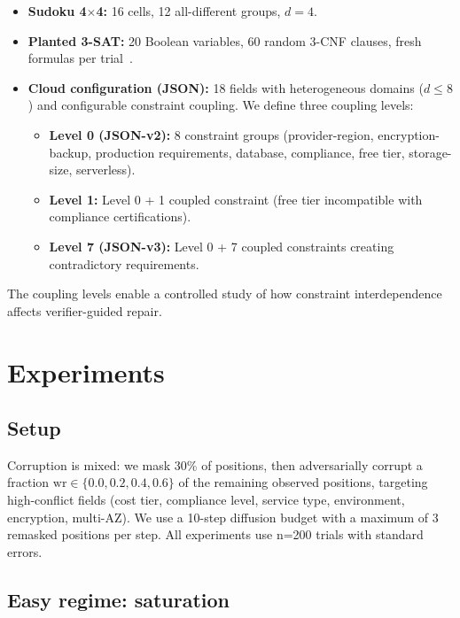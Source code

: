\documentclass[11pt,a4paper,twoside]{article}
\theoremstyle{definition}
\newcommand{\wrtext}{\text{wr}}
\begin{document}
\begin{itemize}[leftmargin=2em]
    \item \textbf{Sudoku 4$\times$4:} 16 cells, 12 all-different groups, $d=4$.
    \item \textbf{Planted 3-SAT:} 20 Boolean variables, 60 random 3-CNF clauses, fresh formulas per trial~\cite{boolsat}.
    \item \textbf{Cloud configuration (JSON):} 18 fields with heterogeneous domains ($d \le 8$) and configurable constraint coupling. We define three coupling levels:
        \begin{itemize}[leftmargin=2em]
            \item \textbf{Level 0 (JSON-v2):} 8 constraint groups (provider-region, encryption-backup, production requirements, database, compliance, free tier, storage-size, serverless).
            \item \textbf{Level 1:} Level 0 + 1 coupled constraint (free tier incompatible with compliance certifications).
            \item \textbf{Level 7 (JSON-v3):} Level 0 + 7 coupled constraints creating contradictory requirements.
        \end{itemize}
\end{itemize}

The coupling levels enable a controlled study of how constraint interdependence affects verifier-guided repair.

\section{Experiments}
\label{sec:experiments}

\subsection{Setup}
\label{sec:setup}

Corruption is mixed: we mask 30\% of positions, then adversarially corrupt a fraction $\wrtext \in \{0.0, 0.2, 0.4, 0.6\}$ of the remaining observed positions, targeting high-conflict fields (cost tier, compliance level, service type, environment, encryption, multi-AZ). We use a 10-step diffusion budget with a maximum of 3 remasked positions per step. All experiments use n=200 trials with standard errors.

\subsection{Easy regime: saturation}
\label{sec:easy}
\end{document}
